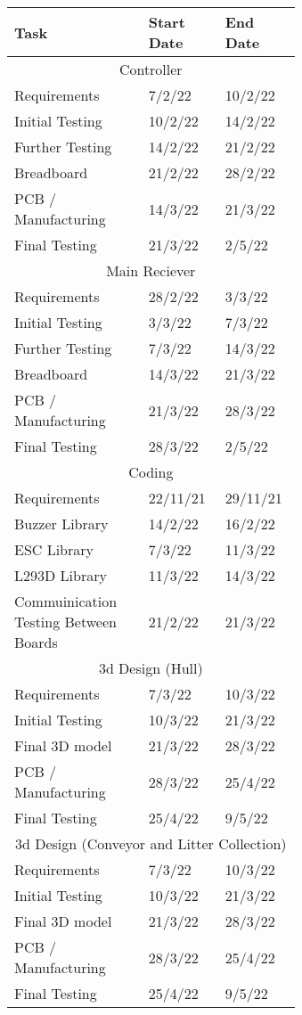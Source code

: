 \documentclass [11pt]{article}
\begin{document}
\begin{table}[H]
\centering
\begin{tabular}{||p{0.4\linewidth}|p{0.12\linewidth}|p{0.12\linewidth}||}
\hline
Task & Start Date & End Date \\
\hline
\multicolumn{3}{||c||}{Controller}\\
\hline
Requirements & 7/2/22 & 10/2/22 \\
\hline
Initial Testing & 10/2/22 & 14/2/22 \\
\hline	
Further Testing & 14/2/22 & 21/2/22 \\
\hline
Breadboard & 21/2/22 &	28/2/22 \\
\hline
PCB / Manufacturing & 14/3/22 &	21/3/22 \\
\hline
Final Testing & 21/3/22 & 2/5/22 \\
\hline
\multicolumn{3}{||c||}{Main Reciever}\\
\hline
Requirements & 28/2/22 & 3/3/22 \\
\hline
Initial Testing & 3/3/22 & 7/3/22 \\	
\hline
Further Testing & 7/3/22 & 14/3/22 \\	
\hline
Breadboard & 14/3/22 &	21/3/22 \\
\hline
PCB / Manufacturing & 21/3/22 &	28/3/22 \\
\hline
Final Testing & 28/3/22 & 2/5/22 \\
\hline	
\multicolumn{3}{||c||}{Coding}\\
\hline
Requirements & 22/11/21 & 29/11/21 \\
\hline
Buzzer Library & 14/2/22 & 16/2/22 \\
\hline
ESC Library & 7/3/22 & 11/3/22 \\
\hline
L293D Library & 11/3/22 & 14/3/22 \\ 
\hline
Commuinication Testing Between Boards & 21/2/22 & 21/3/22 \\
\hline
\multicolumn{3}{||c||}{3d Design (Hull)}\\
\hline
Requirements & 7/3/22 & 10/3/22 \\
\hline
Initial Testing & 10/3/22 & 21/3/22 \\
\hline
Final 3D model & 21/3/22 & 28/3/22 \\
\hline
PCB / Manufacturing & 28/3/22 & 25/4/22 \\
\hline
Final Testing & 25/4/22 & 9/5/22 \\
\hline
\multicolumn{3}{||c||}{3d Design (Conveyor and Litter Collection)}\\
\hline
Requirements & 7/3/22 & 10/3/22 \\
\hline
Initial Testing & 10/3/22 & 21/3/22 \\
\hline
Final 3D model & 21/3/22 & 28/3/22 \\
\hline
PCB / Manufacturing & 28/3/22 & 25/4/22 \\
\hline
Final Testing & 25/4/22 & 9/5/22 \\
\hline
\end{tabular}
\end{table}
\end{document}
